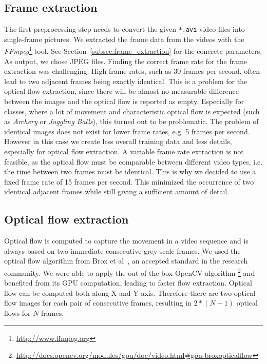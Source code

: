 \subsection{Frame extraction}
The first preprocessing step needs to convert the given \texttt{*.avi} video files into single-frame pictures.
We extracted the frame data from the videos with the \emph{FFmpeg}\footnote{\url{http://www.ffmpeg.org}} tool.
See Section~\ref{subsec:frame_extraction} for the concrete parameters.
As output, we chose JPEG files.
Finding the correct frame rate for the frame extraction was challenging.
High frame rates, such as 30 frames per second, often lead to two adjacent frames being exactly identical.
This is a problem for the optical flow extraction, since there will be almost no measurable difference between the images and the optical flow is reported as empty.
Especially for classes, where a lot of movement and characteristic optical flow is expected (such as \emph{Archery} or \emph{Juggling Balls}), this turned out to be problematic.
The problem of identical images does not exist for lower frame rates, e.g. 5 frames per second.
However in this case we create less overall training data and less details, especially for optical flow extraction.
A variable frame rate extraction is not feasible, as the optical flow must be comparable between different video types, i.e. the time between two frames must be identical.
This is why we decided to use a fixed frame rate of 15 frames per second.
This minimized the occurrence of two identical adjacent frames while still giving a sufficient amount of detail.

\subsection{Optical flow extraction}
Optical flow is computed to capture the movement in a video sequence and is always based on two immediate consecutive grey-scale frames.
We used the optical flow algorithm from Brox et al~\cite{brox2004high}, an accepted standard in the research community.
We were able to apply the out of the box OpenCV algorithm \footnote{\url{http://docs.opencv.org/modules/gpu/doc/video.html\#gpu-broxopticalflow}} and benefited from its GPU computation, leading to faster flow extraction.
Optical flow can be computed both along X and Y axis. Therefore there are two optical flow images for each pair of consecutive frames, resulting in $2 * (N - 1)$ optical flows for $N$ frames.


